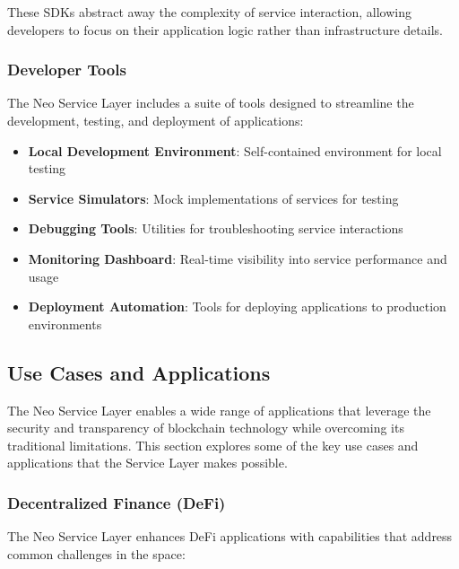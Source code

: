 These SDKs abstract away the complexity of service interaction, allowing developers to focus on their application logic rather than infrastructure details.

\subsubsection{Developer Tools}
\label{subsubsec:developer-tools}

The Neo Service Layer includes a suite of tools designed to streamline the development, testing, and deployment of applications:

\begin{itemize}
    \item \textbf{Local Development Environment}: Self-contained environment for local testing
    \item \textbf{Service Simulators}: Mock implementations of services for testing
    \item \textbf{Debugging Tools}: Utilities for troubleshooting service interactions
    \item \textbf{Monitoring Dashboard}: Real-time visibility into service performance and usage
    \item \textbf{Deployment Automation}: Tools for deploying applications to production environments
\end{itemize}

\subsection{Use Cases and Applications}
\label{subsec:nsl-use-cases}

The Neo Service Layer enables a wide range of applications that leverage the security and transparency of blockchain technology while overcoming its traditional limitations. This section explores some of the key use cases and applications that the Service Layer makes possible.

\subsubsection{Decentralized Finance (DeFi)}
\label{subsubsec:defi}

The Neo Service Layer enhances DeFi applications with capabilities that address common challenges in the space:

